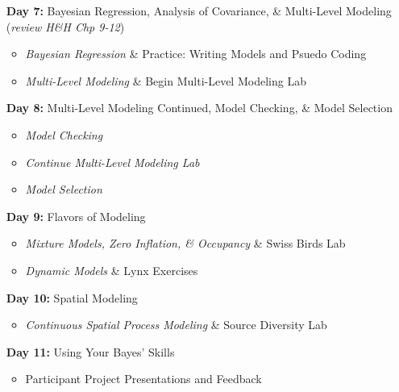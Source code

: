 \documentclass[11pt]{article}
\begin{document}
\begin{enumerate}
\item[\textbf{Day 7:}] Bayesian Regression, Analysis of Covariance, \& Multi-Level Modeling (\emph{review H\&H Chp 9-12})
\begin{itemize}
\item \emph{Bayesian Regression} \& Practice: Writing Models and Psuedo Coding %
\item \emph{Multi-Level Modeling} \& Begin Multi-Level Modeling Lab  %
\end{itemize}


\item[\textbf{Day 8:}] Multi-Level Modeling Continued, Model Checking, \& Model Selection

\begin{itemize}
\item \emph{Model Checking}%
\item  \emph{Continue Multi-Level Modeling Lab} %
\item \emph{Model Selection}%
\end{itemize}

\item[\textbf{Day 9:}] Flavors of Modeling

\begin{itemize}
\item \emph{Mixture Models, Zero Inflation, \& Occupancy} \& Swiss Birds Lab %
\item \emph{Dynamic Models} \& Lynx Exercises %
\end{itemize}

\newpage

\item[\textbf{Day 10:}] Spatial Modeling

\begin{itemize}
\item \emph{Continuous Spatial Process Modeling} \& Source Diversity Lab%
\end{itemize}

\item[\textbf{Day 11:}] Using Your Bayes' Skills

\begin{itemize}
\item Participant Project Presentations and Feedback 
\end{itemize}

\end{enumerate}
\end{document}
